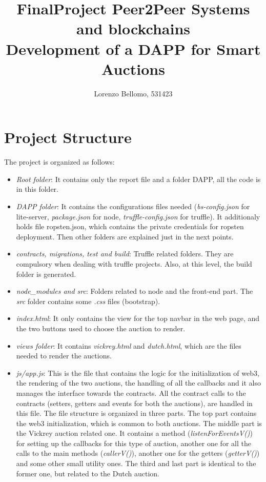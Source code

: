 \documentclass[11pt, a4paper]{report}
\title{
	FinalProject Peer2Peer Systems and blockchains \\
	\large Development of a DAPP for Smart Auctions}
\author{Lorenzo Bellomo, 531423}
\date{}
\begin{document}
	\maketitle
	
\section*{Project Structure}
The project is organized as follows:
\begin{itemize}
	\item \emph{Root folder}: It contains only the report file and a folder DAPP, all the code is in this folder.
	\item \emph{DAPP folder}: It contains the configurations files needed (\emph{bs-config.json} for lite-server, \emph{package.json} for node, \emph{truffle-config.json} for truffle). It additionaly holds file ropsten.json, which contains the private credentials for ropsten deployment. Then other folders are explained just in the next points.
	\item \emph{contracts, migrations, test and build}: Truffle related folders. They are compulsory when dealing with truffle projects. Also, at this level, the build folder is generated.
	\item \emph{node\_modules and src}: Folders related to node and the front-end part. The \emph{src} folder contains some \emph{.css} files (bootstrap).
	\item \emph{index.html}: It only contains the view for the top navbar in the web page, and the two buttons used to choose the auction to render.
	\item \emph{views folder}: It contains \emph{vickrey.html} and \emph{dutch.html}, which are the files needed to render the auctions.
	\item \emph{js/app.js}: This is the file that contains the logic for the initialization of web3, the rendering of the two auctions, the handling of all the callbacks and it also manages the interface towards the contracts. All the contract calls to the contracts (setters, getters and events for both the auctions), are handled in this file. The file structure is organized in three parts. The top part contains the web3 initialization, which is common to both auctions. The middle part is the Vickrey auction related one. It contains a method (\emph{listenForEventsV()}) for setting up the callbacks for this type of auction, another one for all the calls to the main methods (\emph{callerV()}), another one for the getters (\emph{getterV()}) and some other small utility ones. The third and last part is identical to the former one, but related to the Dutch auction.
\end{itemize}
\end{document}
